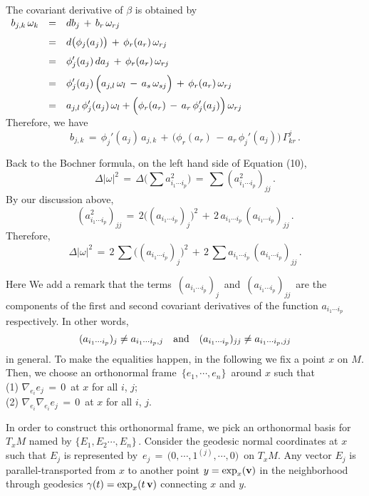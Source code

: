 \documentclass{article}[12pt,a4paper]
\begin{document}
The covariant derivative of $\beta$ is obtained by\\[0.1in]
$ \begin{array}{rcl}
b_{j,k}\, \omega_k &=& \displaystyle db_j \,+\, b_r\, \omega_{rj} \\[0.1in]
&=& \displaystyle 
	d\big(\phi_j(a_j)\big) \,+\, \phi_r(a_r)\,\omega_{rj} \\[0.1in]
&=& \displaystyle 
	\phi_j'(a_j)\, da_j \,+\, \phi_r(a_r)\, \omega_{rj} \\[0.1in]
&=& \displaystyle
	\phi_j'(a_j)\, \Big(a_{j,l}\,\omega_l \,-\, a_s\,\omega_{sj}\Big) \,+\, \phi_r(a_r)\, \omega_{rj} \\[0.1in]
&=& \displaystyle 
	a_{j,l}\,\phi_j'(a_j)\,\omega_l + \Big(\phi_r(a_r) \,-\, a_r\,\phi_j'(a_j)\Big)\, \omega_{rj} \\
\end{array} $ \\[0.1in]

Therefore, we have
$$ b_{j,k} \,=\, \phi_j'(a_j)\, a_{j,k} \,+\, \Big(\phi_r(a_r) \,-\, a_r\,\phi_j'(a_j)\Big)\, \Gamma_{kr}^j\,. $$
\vspace*{2pt}

Back to the Bochner formula, on the left hand side of Equation (10), 
$$ \Delta|\omega|^2 \,=\, \Delta\big(\sum a_{i_1\cdots i_p}^2 \big) \,=\, \sum (a_{i_1\cdots i_p}^2)_{jj}\,. $$
By our discussion above, 
$$ (a_{i_1\cdots i_p}^2)_{jj} \,=\, 2\big((a_{i_1\cdots i_p})_j\big)^2 \,+\, 2\,a_{i_1\cdots i_p}\,(a_{i_1\cdots i_p})_{jj}\,. $$
Therefore, 
$$ \Delta|\omega|^2 \,=\, 2\,\sum \big((a_{i_1\cdots i_p})_j\big)^2 \,+\, 2\, \sum a_{i_1\cdots i_p}\,(a_{i_1\cdots i_p})_{jj}\,. $$
\vspace*{2pt}

Here We add a remark that the terms \,$(a_{i_1\cdots i_p})_j$\, and \,$(a_{i_1\cdots i_p})_{jj}$\, 
are the components of the first and second covariant derivatives of the function $a_{i_1\cdots i_p}$ respectively.
In other words, 
$$ (a_{i_1\cdots i_p})_j \neq a_{i_1\cdots i_p,j} \quad \mbox{and} \quad (a_{i_1\cdots i_p})_{jj} \neq a_{i_1\cdots i_p,jj}$$
in general. To make the equalities happen, in the following we fix a point $x$ on $M$.
Then, we choose an orthonormal frame \,$\big\{e_1,\cdots,e_n\big\}$\, around $x$ such that \\[0.1in]
(1) \quad $\nabla_{e_i}e_j \,=\, 0$\, at $x$ for all $i$, $j$; \\[0.1in]
(2) \quad $\nabla_{e_i} \nabla_{e_i}e_j \,=\, 0$\, at $x$ for all $i$, $j$. \\
\newpage 

In order to construct this orthonormal frame, we pick an orthonormal basis for $T_xM$ named by 
$\big\{E_1, E_2\cdots,E_n\big\}$\,. Consider the geodesic normal coordinates at $x$ 
such that $E_j$ is represented by \,$e_j\,=\,\big(0,\cdots, 1^{(j)},\cdots,0\big)$\, on $T_xM$. 
Any vector $E_j$ is parallel-transported from $x$ to another point $y=\exp_x({\bf v})$ 
in the neighborhood through geodesics $\gamma(t) = \exp_x(t\,{\bf v}) $ connecting $x$ and $y$. \\
\end{document}
